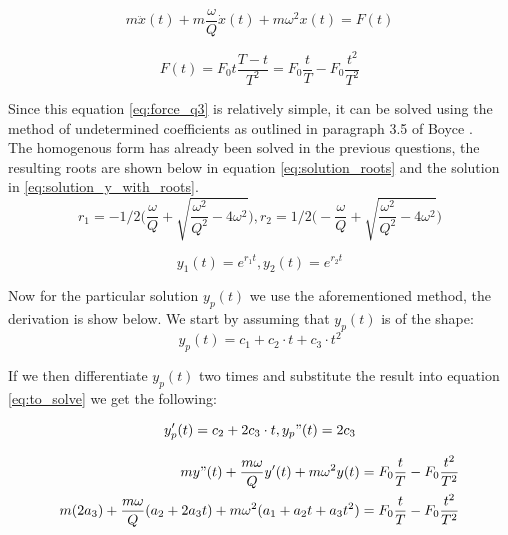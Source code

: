 \begin{equation}
    m \ddot{x}(t)+m\frac{\omega}{Q}\dot{x}(t)+m \omega^2 x(t) = F(t)
    \label{eq:to_solve_app}
\end{equation}

\begin{equation}
    F(t) = F_0 t\frac{T-t}{T^2}= F_0 \frac{t}{T} - F_0 \frac{t^2}{T^2}
    \label{eq:force_q3_app}
\end{equation}

Since this equation \ref{eq:force_q3} is relatively simple, it can be solved using the method of undetermined coefficients as outlined in paragraph 3.5 of Boyce \cite{Boyce}.\\ The homogenous form has already been solved in the previous questions, the resulting roots are shown below in equation \ref{eq:solution_roots} and the solution in \ref{eq:solution_y_with_roots}.\\

\begin{equation}
    r_1 = -1/2 \biggl( \frac{\omega}{Q}+\sqrt{\frac{\omega^2}{Q^2}-4 \omega^2} \biggr), r_2 = 1/2 \biggl( -\frac{\omega}{Q}+\sqrt{\frac{\omega^2}{Q^2}-4 \omega^2} \biggr)
    \label{eq:solution_roots}
\end{equation}

\begin{equation}
    y_1(t) = e^{r_1 t},  y_2(t) = e^{r_2 t}
    \label{eq:solution_y_with_roots}
\end{equation}

Now for the particular solution $y_p(t)$ we use the aforementioned method, the derivation is show below. We start by assuming that $y_p(t)$ is of the shape:\\

\begin{equation*}
    y_p(t) = c_1 + c_2 \cdot t + c_3 \cdot t^2
\end{equation*}

If we then differentiate $y_p(t)$ two times and substitute the result into equation \ref{eq:to_solve} we get the following:

\begin{equation*}
    y_p'(t) = c_2 + 2c_3 \cdot t,    y_p"(t) = 2c_3
\end{equation*}

\begin{align*}
    m y"(t)+ \frac{m \omega}{Q} y'(t) + m \omega^2 y(t) &= F_0 \frac{t}{T} -F_0 \frac{t^2}{T^2}\\
    m (2a_3) + \frac{m \omega}{Q} (a_2 +2a_3 t) + m \omega^2 (a_1 + a_2 t + a_3t^2) &= F_0 \frac{t}{T} -F_0 \frac{t^2}{T^2}
\end{align*}

